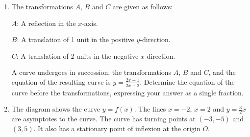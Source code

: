 \begin{problem}
    \begin{enumerate}
        \item The transformations $A$, $B$ and $C$ are given as follows:

        $A$: A reflection in the $x$-axis.

        $B$: A translation of 1 unit in the positive $y$-direction.

        $C$: A translation of 2 units in the negative $x$-direction.

        A curve undergoes in succession, the transformations $A$, $B$ and $C$, and the equation of the resulting curve is $y = \frac{2x+1}{2x+2}$. Determine the equation of the curve before the transformations, expressing your answer as a single fraction.
        \item The diagram shows the curve $y = f(x)$. The lines $x = -2$, $x = 2$ and $y = \frac32 x$ are asymptotes to the curve. The curve has turning points at $(-3, -5)$ and $(3, 5)$. It also has a stationary point of inflexion at the origin $O$.
        \begin{center}
\end{center}
\end{enumerate}
\end{problem}
